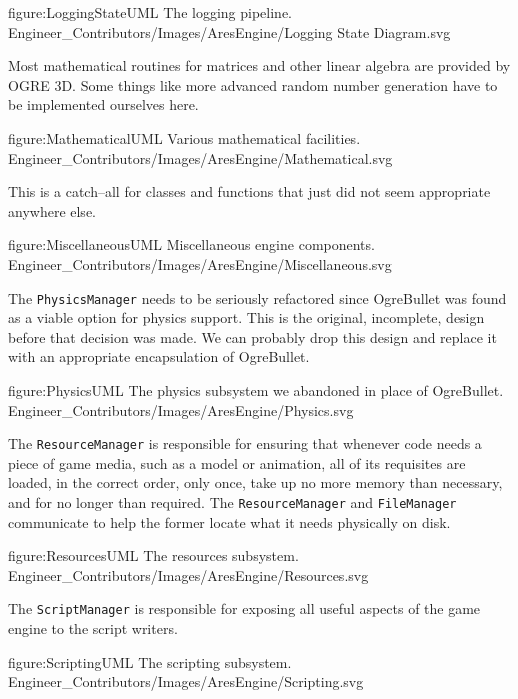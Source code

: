 \FullPageDiagram
    {figure:LoggingStateUML}
    {The logging pipeline.}
    {Engineer_Contributors/Images/AresEngine/Logging State Diagram.svg}

\page 
{}
Most mathematical routines for matrices and other linear algebra are provided by OGRE 3D. Some things like more advanced random number generation have to be implemented ourselves here.

\FullPageDiagram
    {figure:MathematicalUML}
    {Various mathematical facilities.}
    {Engineer_Contributors/Images/AresEngine/Mathematical.svg}

\page 
{}
This is a catch--all for classes and functions that just did not seem appropriate anywhere else.

\FullPageDiagram
    {figure:MiscellaneousUML}
    {Miscellaneous engine components.}
    {Engineer_Contributors/Images/AresEngine/Miscellaneous.svg}

\page 
{}
The {\tt PhysicsManager} needs to be seriously refactored since OgreBullet was found as a viable option for physics support. This is the original, incomplete, design before that decision was made. We can probably drop this design and replace it with an appropriate encapsulation of OgreBullet.

\FullPageDiagram
    {figure:PhysicsUML}
    {The physics subsystem we abandoned in place of OgreBullet.}
    {Engineer_Contributors/Images/AresEngine/Physics.svg}

\page 
{}
The {\tt ResourceManager} is responsible for ensuring that whenever code needs a piece of game media, such as a model or animation, all of its requisites are loaded, in the correct order, only once, take up no more memory than necessary, and for no longer than required. The {\tt ResourceManager} and {\tt FileManager} communicate to help the former locate what it needs physically on disk.

\FullPageDiagram
    {figure:ResourcesUML}
    {The resources subsystem.}
    {Engineer_Contributors/Images/AresEngine/Resources.svg}

\page 
{}
The {\tt ScriptManager} is responsible for exposing all useful aspects of the game engine to the script writers.

\FullPageDiagram
    {figure:ScriptingUML}
    {The scripting subsystem.}
    {Engineer_Contributors/Images/AresEngine/Scripting.svg}

